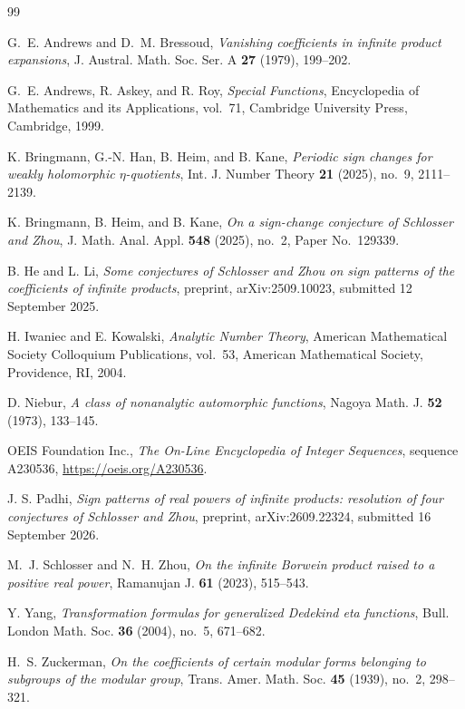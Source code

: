 \documentclass[11pt]{amsart}
\numberwithin{equation}{section}
\theoremstyle{definition}
\theoremstyle{remark}
\begin{document}
\begin{thebibliography}{99}

G.~E. Andrews and D.~M. Bressoud, \emph{Vanishing coefficients in infinite product expansions}, J. Austral. Math. Soc. Ser. A \textbf{27} (1979), 199--202.

G.~E. Andrews, R. Askey, and R. Roy, \emph{Special Functions}, Encyclopedia of Mathematics and its Applications, vol.~71, Cambridge University Press, Cambridge, 1999.

K. Bringmann, G.-N. Han, B. Heim, and B. Kane, \emph{Periodic sign changes for weakly holomorphic $\eta$-quotients}, Int. J. Number Theory \textbf{21} (2025), no.~9, 2111--2139.

K. Bringmann, B. Heim, and B. Kane, \emph{On a sign-change conjecture of Schlosser and Zhou}, J. Math. Anal. Appl. \textbf{548} (2025), no.~2, Paper No.~129339.

B. He and L. Li, \emph{Some conjectures of Schlosser and Zhou on sign patterns of the coefficients of infinite products}, preprint, arXiv:2509.10023, submitted 12 September 2025.

H. Iwaniec and E. Kowalski, \emph{Analytic Number Theory}, American Mathematical Society Colloquium Publications, vol.~53, American Mathematical Society, Providence, RI, 2004.

D. Niebur, \emph{A class of nonanalytic automorphic functions}, Nagoya Math. J. \textbf{52} (1973), 133--145.

OEIS Foundation Inc., \emph{The On-Line Encyclopedia of Integer Sequences}, sequence A230536, \url{https://oeis.org/A230536}.

J. S. Padhi, \emph{Sign patterns of real powers of infinite products: resolution of four conjectures of Schlosser and Zhou}, preprint, arXiv:2609.22324, submitted 16 September 2026.

M.~J. Schlosser and N.~H. Zhou, \emph{On the infinite Borwein product raised to a positive real power}, Ramanujan J. \textbf{61} (2023), 515--543.

Y. Yang, \emph{Transformation formulas for generalized Dedekind eta functions}, Bull. London Math. Soc. \textbf{36} (2004), no.~5, 671--682.

H.~S. Zuckerman, \emph{On the coefficients of certain modular forms belonging to subgroups of the modular group}, Trans. Amer. Math. Soc. \textbf{45} (1939), no.~2, 298--321.

\end{thebibliography}
\end{document}
